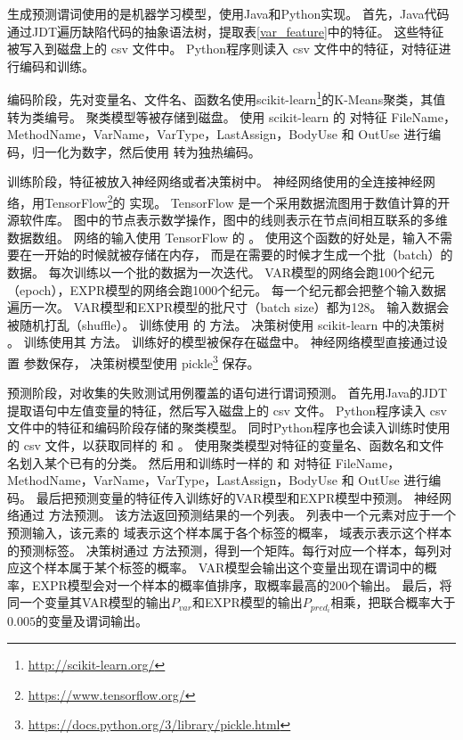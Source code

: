 生成预测谓词使用的是机器学习模型，使用Java和Python实现。
首先，Java代码通过JDT遍历缺陷代码的抽象语法树，提取表\ref{var_feature}中的特征。
这些特征被写入到磁盘上的 csv 文件中。
Python程序则读入 csv 文件中的特征，对特征进行编码和训练。

编码阶段，先对变量名、文件名、函数名使用scikit-learn\footnote{\url{http://scikit-learn.org/}}的K-Means聚类，其值转为类编号。
聚类模型等被存储到磁盘。
使用 scikit-learn 的  对特征 FileName，MethodName，VarName，VarType，LastAssign，BodyUse
和 OutUse 进行编码，归一化为数字，然后使用  转为独热编码。

训练阶段，特征被放入神经网络或者决策树中。
神经网络使用的全连接神经网络，用TensorFlow\footnote{\url{https://www.tensorflow.org/}}的  实现。
TensorFlow 是一个采用数据流图用于数值计算的开源软件库。
图中的节点表示数学操作，图中的线则表示在节点间相互联系的多维数据数组。
网络的输入使用 TensorFlow 的 。
使用这个函数的好处是，输入不需要在一开始的时候就被存储在内存，
而是在需要的时候才生成一个批（batch）的数据。
每次训练以一个批的数据为一次迭代。
VAR模型的网络会跑100个纪元（epoch），EXPR模型的网络会跑1000个纪元。
每一个纪元都会把整个输入数据遍历一次。
VAR模型和EXPR模型的批尺寸（batch size）都为128。
输入数据会被随机打乱（shuffle）。
训练使用  的  方法。
决策树使用 scikit-learn 中的决策树  。
训练使用其  方法。
训练好的模型被保存在磁盘中。
神经网络模型直接通过设置  参数保存，
决策树模型使用 pickle\footnote{\url{https://docs.python.org/3/library/pickle.html}} 保存。

预测阶段，对收集的失败测试用例覆盖的语句进行谓词预测。
首先用Java的JDT提取语句中左值变量的特征，然后写入磁盘上的 csv 文件。
Python程序读入 csv 文件中的特征和编码阶段存储的聚类模型。
同时Python程序也会读入训练时使用的 csv 文件，以获取同样的  和 。
使用聚类模型对特征的变量名、函数名和文件名划入某个已有的分类。
然后用和训练时一样的  和  对特征 FileName，MethodName，VarName，VarType，LastAssign，BodyUse
和 OutUse 进行编码。
最后把预测变量的特征传入训练好的VAR模型和EXPR模型中预测。
神经网络通过  方法预测。
该方法返回预测结果的一个列表。
列表中一个元素对应于一个预测输入，该元素的  域表示这个样本属于各个标签的概率，
 域表示表示这个样本的预测标签。
决策树通过  方法预测，得到一个矩阵。每行对应一个样本，每列对应这个样本属于某个标签的概率。
VAR模型会输出这个变量出现在谓词中的概率，EXPR模型会对一个样本的概率值排序，取概率最高的200个输出。
最后，将同一个变量其VAR模型的输出$P_{var}$和EXPR模型的输出$P_{pred_i}$相乘，把联合概率大于$0.005$的变量及谓词输出。

